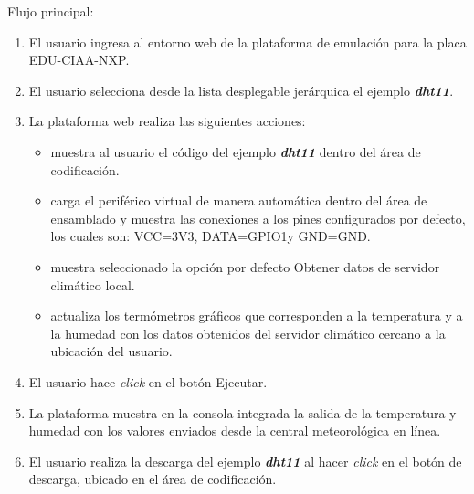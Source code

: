 Flujo principal:
\begin{enumerate}
	\item El usuario ingresa al entorno web de la plataforma de emulación para la placa EDU-CIAA-NXP.
	\item El usuario selecciona desde la lista desplegable jerárquica el ejemplo \textit{\textbf{dht11}}.
	\item La plataforma web realiza las siguientes acciones:
	 
	\begin{itemize}
	    \item muestra al usuario el código  del ejemplo \textit{\textbf{dht11}} dentro del área de codificación.
	    \item carga el periférico virtual de manera automática dentro del área de ensamblado y muestra las conexiones a los pines configurados por defecto, los cuales son: \textquotedbl VCC=3V3\textquotedbl, \textquotedbl DATA=GPIO1\textquotedbl y \textquotedbl GND=GND\textquotedbl{}.
	    \item muestra seleccionado la opción por defecto \textquotedbl Obtener datos de servidor climático local.\textquotedbl
	    \item actualiza los termómetros gráficos que corresponden a la temperatura y a la humedad con los datos obtenidos del servidor climático cercano a la ubicación del usuario.
	\end{itemize}

	\item El usuario hace \textit{click} en el botón \textquotedbl Ejecutar\textquotedbl.
	\item La plataforma muestra en la consola integrada la salida de la temperatura y humedad con los valores enviados desde la central meteorológica en línea.
	\item El usuario realiza la descarga del ejemplo \textit{\textbf{dht11}} al hacer \textit{click} en el botón de descarga, ubicado en el área de codificación.
\end{enumerate}

